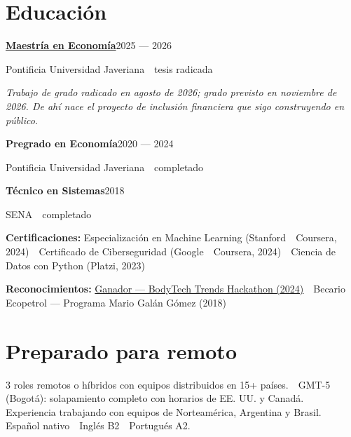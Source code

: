 \documentclass[a4paper,10pt]{article}
\newcommand{\headline}[2]{\needspace{3\baselineskip}\textbf{\color{ink}#1}\hfill{\small #2}\par}
\begin{document}
\section*{Educación}
\headline{\href{https://proyecto-davirson-git.vercel.app/es/research/fintech-inclusion}{Maestría en Economía}}{2025 --- 2026}
{\small Pontificia Universidad Javeriana \,\textperiodcentered\, tesis radicada}\par
{\small\itshape Trabajo de grado radicado en agosto de 2026; grado previsto en noviembre de 2026. De ahí nace el proyecto de inclusión financiera que sigo construyendo en público.}\par
\vspace{1pt}
\headline{Pregrado en Economía}{2020 --- 2024}
{\small Pontificia Universidad Javeriana \,\textperiodcentered\, completado}\par
\vspace{1pt}
\headline{Técnico en Sistemas}{2018}
{\small SENA \,\textperiodcentered\, completado}\par
\vspace{1pt}
\vspace{3pt}
\textbf{\color{ink}Certificaciones:} Especialización en Machine Learning (Stanford \,\textperiodcentered\, Coursera, 2024) \,\textperiodcentered\, Certificado de Ciberseguridad (Google \,\textperiodcentered\, Coursera, 2024) \,\textperiodcentered\, Ciencia de Datos con Python (Platzi, 2023)\par\vspace{3pt}
\textbf{\color{ink}Reconocimientos:} \href{https://public.tableau.com/app/profile/davirson.novoa/viz/BodyTrendsADataAnalysisProject/TrendsAnalysis}{Ganador --- BodyTech Trends Hackathon (2024)} \,\textperiodcentered\, Becario Ecopetrol --- Programa Mario Galán Gómez (2018)\par

\section*{Preparado para remoto}
3 roles remotos o híbridos con equipos distribuidos en 15+ países. \,\textperiodcentered\, GMT-5 (Bogotá): solapamiento completo con horarios de EE. UU. y Canadá. \,\textperiodcentered\, Experiencia trabajando con equipos de Norteamérica, Argentina y Brasil. \,\textperiodcentered\, Español nativo \,\textperiodcentered\, Inglés B2 \,\textperiodcentered\, Portugués A2.
\end{document}
